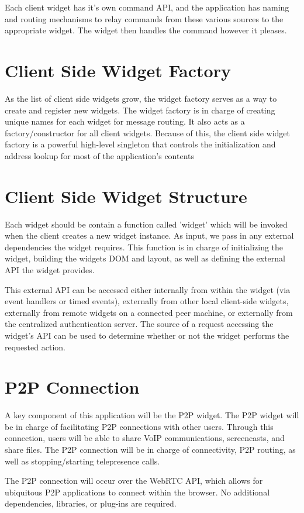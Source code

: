 \documentclass[a4paper,12pt]{report}
\begin{document}
Each client widget has it's own command API, and the application has naming and routing mechanisms to relay commands from these various sources to the appropriate widget. The widget then handles the command however it pleases.
\section{Client Side Widget Factory}
As the list of client side widgets grow, the widget factory serves as a way to create and register new widgets. The widget factory is in charge of creating unique names for each widget for message routing. It also acts as a factory/constructor for all client widgets. Because of this, the client side widget factory is a powerful high-level singleton that controls the initialization and address lookup for most of the application's contents
\section{Client Side Widget Structure}
Each widget should be contain a function called 'widget' which will be invoked when the client creates a new widget instance. As input, we pass in any external dependencies the widget requires. This function is in charge of initializing the widget, building the widgets DOM and layout, as well as defining the external API the widget provides.

This external API can be accessed either internally from within the widget (via event handlers or timed events), externally from other local client-side widgets, externally from remote widgets on a connected peer machine, or externally from the centralized authentication server. The source of a request accessing the widget's API can be used to determine whether or not the widget performs the requested action.
\section{P2P Connection}
A key component of this application will be the P2P widget. The P2P widget will be in charge of facilitating P2P connections with other users. Through this connection, users will be able to share VoIP communications, screencasts, and share files. The P2P connection will be in charge of connectivity, P2P routing, as well as stopping/starting telepresence calls.

The P2P connection will occur over the WebRTC API, which allows for ubiquitous P2P applications to connect within the browser. No additional dependencies, libraries, or plug-ins are required.
\iffalse
\end{document}
